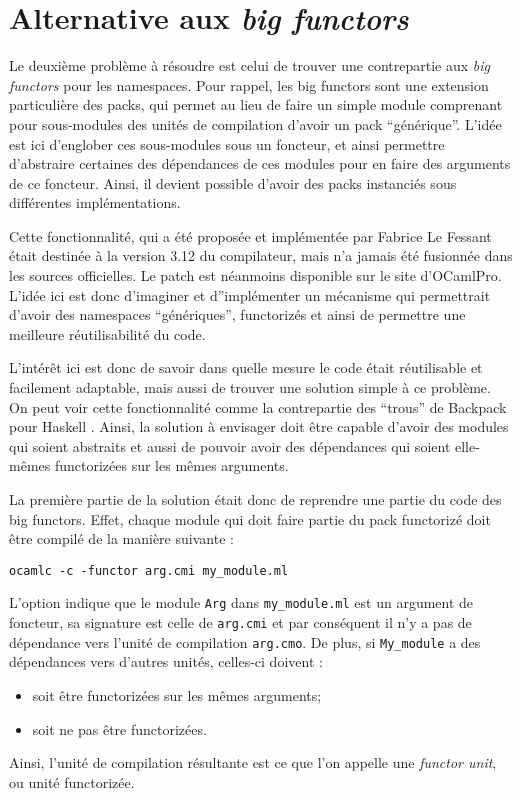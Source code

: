 \documentclass[11pt,a4paper]{report}
\begin{document}
\section{Alternative aux \emph{big functors}}

Le deuxième problème à résoudre est celui de trouver une contrepartie aux
\emph{big functors} pour les namespaces. Pour rappel, les big functors sont une
extension particulière des packs, qui permet au lieu de faire un simple module
comprenant pour sous-modules des unités de compilation d'avoir un pack
``générique''. L'idée est ici d'englober ces sous-modules sous un foncteur, et
ainsi permettre d'abstraire certaines des dépendances de ces modules pour en
faire des arguments de ce foncteur. Ainsi, il devient possible d'avoir des packs
instanciés sous différentes implémentations.

Cette fonctionnalité, qui a été proposée et implémentée par Fabrice Le Fessant
était destinée à la version 3.12 du compilateur, mais n'a jamais été fusionnée
dans les sources officielles. Le patch est néanmoins disponible sur le site
d'OCamlPro. L'idée ici est donc d'imaginer et d''implémenter un mécanisme qui
permettrait d'avoir des namespaces ``génériques'', functorizés et ainsi de
permettre une meilleure réutilisabilité du code.

L'intérêt ici est donc de savoir dans quelle mesure le code était réutilisable
et facilement adaptable, mais aussi de trouver une solution simple à ce
problème. On peut voir cette fonctionnalité comme la contrepartie des ``trous''
de Backpack pour Haskell \cite{KilpatrickDJM14}. Ainsi, la solution à envisager
doit être capable d'avoir des modules qui soient abstraits et aussi de pouvoir
avoir des dépendances qui soient elle-mêmes functorizées sur les mêmes
arguments.

La première partie de la solution était donc de reprendre une partie du code des
big functors. Effet, chaque module qui doit faire partie du pack functorizé doit
être compilé de la manière suivante :
\begin{verbatim}
ocamlc -c -functor arg.cmi my_module.ml
\end{verbatim}
L'option indique que le module \texttt{Arg} dans \texttt{my\_module.ml} est un
argument de foncteur, sa signature est celle de \texttt{arg.cmi} et par
conséquent il n'y a pas de dépendance vers l'unité de compilation
\texttt{arg.cmo}. De plus, si \texttt{My_module} a des dépendances vers d'autres
unités, celles-ci doivent :
\begin{itemize}
\item soit être functorizées sur les mêmes arguments;
\item soit ne pas être functorizées.
\end{itemize}
Ainsi, l'unité de compilation résultante est ce que l'on appelle une
\emph{functor unit}, ou unité functorizée. 
\end{document}
